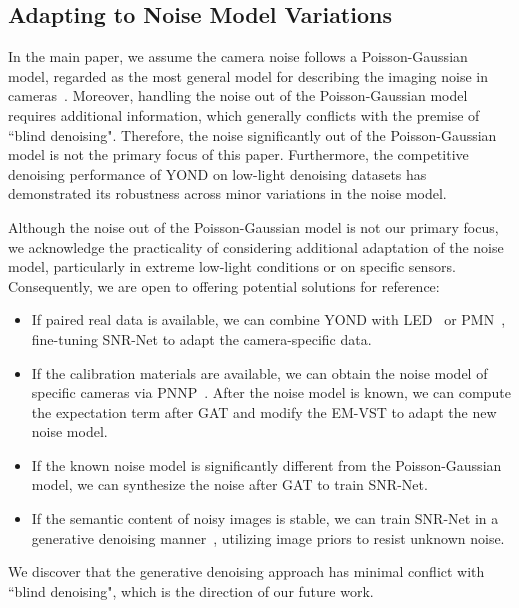 \documentclass[lettersize,journal]{IEEEtran}
\begin{document}
\subsection{Adapting to Noise Model Variations}\label{sec:noise_model}
In the main paper, we assume the camera noise follows a Poisson-Gaussian model, regarded as the most general model for describing the imaging noise in cameras~\cite{EMVA1288}. 
Moreover, handling the noise out of the Poisson-Gaussian model requires additional information, which generally conflicts with the premise of ``blind denoising". Therefore, the noise significantly out of the Poisson-Gaussian model is not the primary focus of this paper. Furthermore, the competitive denoising performance of YOND on low-light denoising datasets has demonstrated its robustness across minor variations in the noise model.

Although the noise out of the Poisson-Gaussian model is not our primary focus, we acknowledge the practicality of considering additional adaptation of the noise model, particularly in extreme low-light conditions or on specific sensors. Consequently, we are open to offering potential solutions for reference:

\begin{itemize}[leftmargin=0.7cm]
\item If paired real data is available, we can combine YOND with LED~\cite{ICCV23/LED} or PMN~\cite{TPAMI23/PMN}, fine-tuning SNR-Net to adapt the camera-specific data.

\item If the calibration materials are available, we can obtain the noise model of specific cameras via PNNP~\cite{PNNP}. 
After the noise model is known, we can compute the expectation term after GAT and modify the EM-VST to adapt the new noise model.

\item If the known noise model is significantly different from the Poisson-Gaussian model, we can synthesize the noise after GAT to train SNR-Net.

\item If the semantic content of noisy images is stable, we can train SNR-Net in a generative denoising manner~\cite{NIPS20/DDPM, ICLR21/DDIM, DMID, ICLR21/VE-SDE}, utilizing image priors to resist unknown noise.
\end{itemize}

We discover that the generative denoising approach has minimal conflict with ``blind denoising", which is the direction of our future work.
\end{document}
